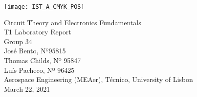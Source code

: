 
\thispagestyle {empty}

\texttt{[image: IST\_A\_CMYK\_POS]}

\begin{center}
%
\vspace{1.0cm}

\vspace{1cm}
{\FontLb Circuit Theory and Electronics Fundamentals} \\ %
\vspace{5cm}
{\FontLn T1 Laboratory Report}\vspace{1cm} \\
\vspace{5cm}
{\FontLb Group 34} \\
\vspace{1cm}
{\FontSn José Bento, Nº95815} \\
{\FontSn Thomas Childs, Nº 95847} \\
{\FontSn Luís Pacheco, Nº 96425} \\
\vspace{1cm}
{\FontSn Aerospace Engineering (MEAer), Técnico, University of Lisbon} \\ %
\vspace{1cm}
{\FontSn March 22, 2021} \\ %
%
\end{center}

